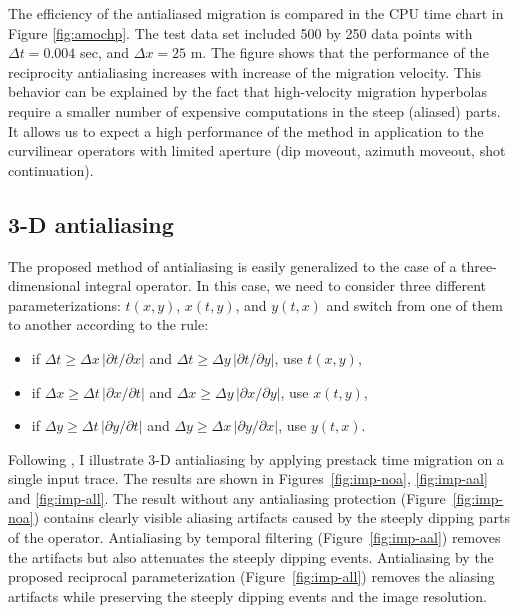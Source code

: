 The efficiency of the antialiased migration is compared in the CPU
time chart in Figure \ref{fig:amochp}.  The test data set included 500
by 250 data points with $\Delta t=0.004$ sec, and $\Delta x = 25$ m.
The figure shows that the performance of the reciprocity antialiasing
increases with increase of the migration velocity. This behavior can
be explained by the fact that high-velocity migration hyperbolas
require a smaller number of expensive computations in the steep
(aliased) parts. It allows us to expect a high performance of the
method in application to the curvilinear operators with limited
aperture (dip moveout, azimuth moveout, shot continuation).


\subsection{3-D antialiasing}

The proposed method of antialiasing is easily generalized to the case
of a three-dimensional integral operator. In this case, we need to
consider three different parameterizations: $t(x,y)$, $x(t,y)$, and
$y(t,x)$ and switch from one of them to another according to the rule:
\begin{itemize}
\item if $\Delta t \geq {{\Delta x} \, {|\partial t / \partial x|}}$
and      $\Delta t \geq {{\Delta y} \, {|\partial t / \partial y|}}$,
use $t(x,y)$,
\item if $\Delta x \geq {{\Delta t} \, {|\partial x / \partial t|}}$
and      $\Delta x \geq {{\Delta y} \, {|\partial x / \partial y|}}$,
use $x(t,y)$,
\item if $\Delta y \geq {{\Delta t} \, {|\partial y / \partial t|}}$
and      $\Delta y \geq {{\Delta x} \, {|\partial y / \partial x|}}$,
use $y(t,x)$.
\end{itemize}

Following , I illustrate 3-D
antialiasing by applying prestack time migration on a single input
trace. The results are shown in Figures~\ref{fig:imp-noa},
\ref{fig:imp-aal} and \ref{fig:imp-all}. The result without any
antialiasing protection (Figure~\ref{fig:imp-noa}) contains clearly
visible aliasing artifacts caused by the steeply dipping parts of the
operator. Antialiasing by temporal filtering
(Figure~\ref{fig:imp-aal}) removes the artifacts but also attenuates
the steeply dipping events. Antialiasing by the proposed reciprocal
parameterization (Figure~\ref{fig:imp-all}) removes the aliasing
artifacts while preserving the steeply dipping events and the image
resolution.

